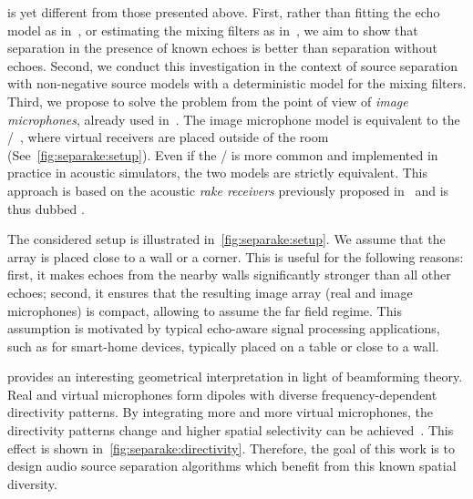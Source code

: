  is yet different from those presented above.
First, rather than fitting the echo model as in~, or estimating the mixing filters as in~,
we aim to show that separation in the presence of known echoes is better than separation without echoes.
Second, we conduct this investigation in the context of source separation with non-negative source models with a deterministic model for the mixing filters.
Third, we propose to solve the problem from the point of view of \textit{image microphones}, already used in~.
The image microphone model is equivalent to the \ISMdef/~, where virtual receivers are placed outside of the room (See~\cref{fig:separake:setup}).
Even if the \ISM/ is more common and implemented in practice in acoustic simulators, the two models are strictly equivalent.
This approach is based on the acoustic \textit{rake receivers} previously proposed in~ and is thus dubbed .


\mynewline
The considered setup is illustrated in~\cref{fig:separake:setup}.
We assume that the array is placed close to a wall or a corner.
This is useful for the following reasons:
first, it makes echoes from the nearby walls significantly stronger than all other echoes;
second, it ensures that the resulting image array (real and image microphones) is compact, allowing to assume the far field regime.
This assumption is motivated by typical echo-aware signal processing applications, such as for smart-home devices, typically placed on a table or close to a wall.

 provides an interesting geometrical interpretation in light of beamforming theory.
Real and virtual microphones form dipoles with diverse frequency-dependent directivity patterns.
By integrating more and more virtual microphones, the directivity patterns change and higher spatial selectivity can be achieved~.
This effect is shown in~\cref{fig:separake:directivity}.
Therefore, the goal of this work is to design audio source separation algorithms which benefit from this known spatial diversity.

